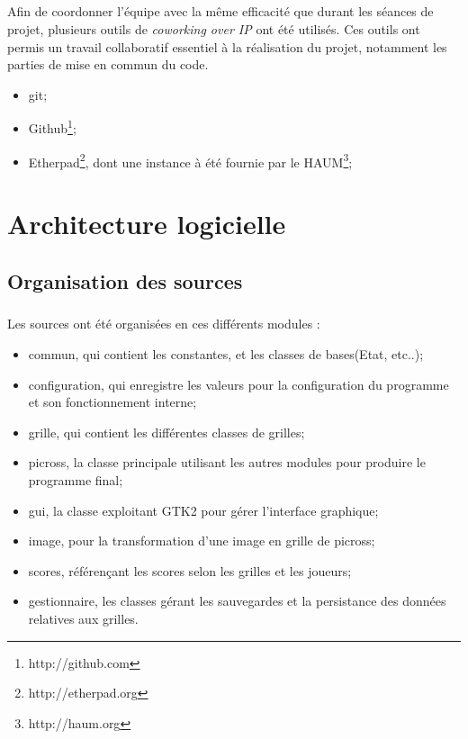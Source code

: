         \paragraph*{}
         Afin de coordonner l'équipe avec la même efficacité que durant les séances de projet, plusieurs outils de \textit{coworking over IP} ont  été utilisés.
Ces outils ont permis un travail collaboratif essentiel à la réalisation du projet, notamment les parties de mise en commun du code.
        \begin{itemize}
                \item git;
                \item Github\footnote{http://github.com};
                \item Etherpad\footnote{http://etherpad.org}, dont une instance à été fournie par le HAUM\footnote{http://haum.org};
        \end{itemize}






\chapter{Architecture logicielle}


\section{Organisation des sources}
        \paragraph*{}
   Les sources ont été organisées en ces différents modules :
    \begin{itemize}
             \item commun, qui contient les constantes, et les classes de bases(Etat, etc..);
             \item configuration, qui enregistre les valeurs pour la configuration du programme et son fonctionnement interne;
             \item grille, qui contient les différentes classes de grilles;
             \item picross, la classe principale utilisant les autres modules pour produire le programme final;
             \item gui, la classe exploitant GTK2 pour gérer l'interface graphique;
             \item image, pour la transformation d'une image en grille de picross;
             \item scores, référençant les scores selon les grilles et les joueurs;
             \item gestionnaire, les classes gérant les sauvegardes et la persistance des données relatives aux grilles. %
        \end{itemize}
        
